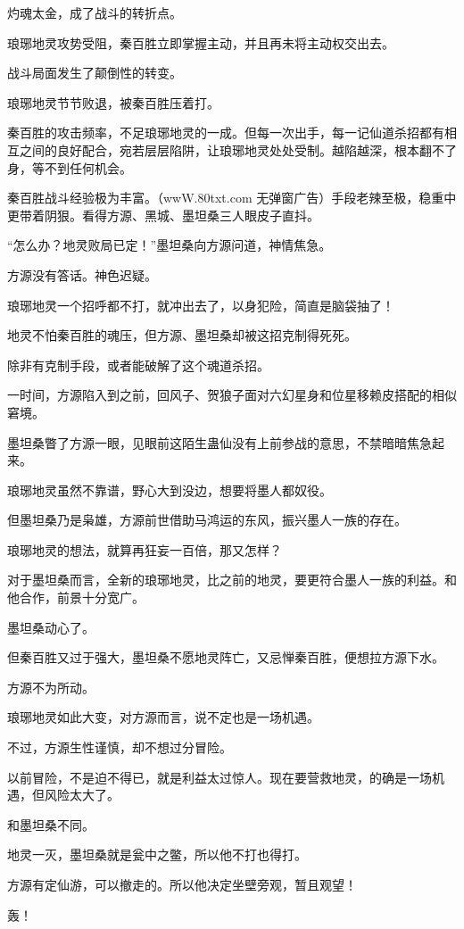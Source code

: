 \begin{this_body}
灼魂太金，成了战斗的转折点。

琅琊地灵攻势受阻，秦百胜立即掌握主动，并且再未将主动权交出去。

战斗局面发生了颠倒性的转变。

琅琊地灵节节败退，被秦百胜压着打。

秦百胜的攻击频率，不足琅琊地灵的一成。但每一次出手，每一记仙道杀招都有相互之间的良好配合，宛若层层陷阱，让琅琊地灵处处受制。越陷越深，根本翻不了身，等不到任何机会。

秦百胜战斗经验极为丰富。（wwW.80txt.com 无弹窗广告）手段老辣至极，稳重中更带着阴狠。看得方源、黑城、墨坦桑三人眼皮子直抖。

“怎么办？地灵败局已定！”墨坦桑向方源问道，神情焦急。

方源没有答话。神色迟疑。

琅琊地灵一个招呼都不打，就冲出去了，以身犯险，简直是脑袋抽了！

地灵不怕秦百胜的魂压，但方源、墨坦桑却被这招克制得死死。

除非有克制手段，或者能破解了这个魂道杀招。

一时间，方源陷入到之前，回风子、贺狼子面对六幻星身和位星移赖皮搭配的相似窘境。

墨坦桑瞥了方源一眼，见眼前这陌生蛊仙没有上前参战的意思，不禁暗暗焦急起来。

琅琊地灵虽然不靠谱，野心大到没边，想要将墨人都奴役。

但墨坦桑乃是枭雄，方源前世借助马鸿运的东风，振兴墨人一族的存在。

琅琊地灵的想法，就算再狂妄一百倍，那又怎样？

对于墨坦桑而言，全新的琅琊地灵，比之前的地灵，要更符合墨人一族的利益。和他合作，前景十分宽广。

墨坦桑动心了。

但秦百胜又过于强大，墨坦桑不愿地灵阵亡，又忌惮秦百胜，便想拉方源下水。

方源不为所动。

琅琊地灵如此大变，对方源而言，说不定也是一场机遇。

不过，方源生性谨慎，却不想过分冒险。

以前冒险，不是迫不得已，就是利益太过惊人。现在要营救地灵，的确是一场机遇，但风险太大了。

和墨坦桑不同。

地灵一灭，墨坦桑就是瓮中之鳖，所以他不打也得打。

方源有定仙游，可以撤走的。所以他决定坐壁旁观，暂且观望！

轰！


\end{this_body}
